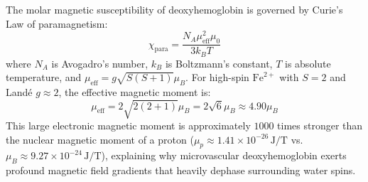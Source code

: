 \documentclass[11pt,a4paper]{article}
\begin{document}
\begin{physicsbox}
The molar magnetic susceptibility of deoxyhemoglobin is governed by Curie's Law of paramagnetism:
\begin{equation}
    \chi_{\text{para}} = \frac{N_A \mu_{\text{eff}}^2 \mu_0}{3 k_B T}
\end{equation}
where $N_A$ is Avogadro's number, $k_B$ is Boltzmann's constant, $T$ is absolute temperature, and $\mu_{\text{eff}} = g \sqrt{S(S+1)} \mu_B$. For high-spin $\text{Fe}^{2+}$ with $S=2$ and Landé $g \approx 2$, the effective magnetic moment is:
\begin{equation}
    \mu_{\text{eff}} = 2\sqrt{2(2+1)} \mu_B = 2\sqrt{6}\mu_B \approx 4.90 \mu_B
\end{equation}
This large electronic magnetic moment is approximately $1000$ times stronger than the nuclear magnetic moment of a proton ($\mu_p \approx 1.41 \times 10^{-26}\,\text{J/T}$ vs. $\mu_B \approx 9.27 \times 10^{-24}\,\text{J/T}$), explaining why microvascular deoxyhemoglobin exerts profound magnetic field gradients that heavily dephase surrounding water spins.
\end{physicsbox}
\end{document}
